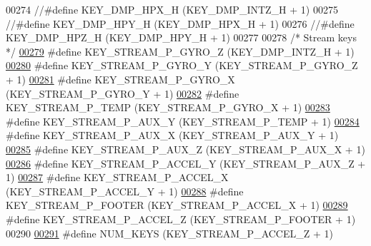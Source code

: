 \begin{DoxyCode}
00274 \textcolor{comment}{//#define KEY\_DMP\_HPX\_H               (KEY\_DMP\_INTZ\_H + 1)}
00275 \textcolor{comment}{//#define KEY\_DMP\_HPY\_H               (KEY\_DMP\_HPX\_H + 1)}
00276 \textcolor{comment}{//#define KEY\_DMP\_HPZ\_H               (KEY\_DMP\_HPY\_H + 1)}
00277 
00278 \textcolor{comment}{/* Stream keys */}
\hypertarget{dmp_key_8h_source.tex_l00279}{}\hyperlink{dmp_key_8h_aa5d4b294e70011d67eb69fac5fd25a2b}{00279} \textcolor{preprocessor}{#define KEY\_STREAM\_P\_GYRO\_Z         (KEY\_DMP\_INTZ\_H + 1)}
\hypertarget{dmp_key_8h_source.tex_l00280}{}\hyperlink{dmp_key_8h_a5fa600da02cc72043e861e7ce367883f}{00280} \textcolor{preprocessor}{#define KEY\_STREAM\_P\_GYRO\_Y         (KEY\_STREAM\_P\_GYRO\_Z + 1)}
\hypertarget{dmp_key_8h_source.tex_l00281}{}\hyperlink{dmp_key_8h_a57050efd179f73b7cbd39acfda55aaa9}{00281} \textcolor{preprocessor}{#define KEY\_STREAM\_P\_GYRO\_X         (KEY\_STREAM\_P\_GYRO\_Y + 1)}
\hypertarget{dmp_key_8h_source.tex_l00282}{}\hyperlink{dmp_key_8h_a8165ecdca80347f0afcc058a0328eb26}{00282} \textcolor{preprocessor}{#define KEY\_STREAM\_P\_TEMP           (KEY\_STREAM\_P\_GYRO\_X + 1)}
\hypertarget{dmp_key_8h_source.tex_l00283}{}\hyperlink{dmp_key_8h_a19282ce8b2d02687eef36c9d9b94fa96}{00283} \textcolor{preprocessor}{#define KEY\_STREAM\_P\_AUX\_Y          (KEY\_STREAM\_P\_TEMP + 1)}
\hypertarget{dmp_key_8h_source.tex_l00284}{}\hyperlink{dmp_key_8h_a905a8b6b6a702a439eec4793921d6338}{00284} \textcolor{preprocessor}{#define KEY\_STREAM\_P\_AUX\_X          (KEY\_STREAM\_P\_AUX\_Y + 1)}
\hypertarget{dmp_key_8h_source.tex_l00285}{}\hyperlink{dmp_key_8h_a49e10328ac2c75c11481933baff54862}{00285} \textcolor{preprocessor}{#define KEY\_STREAM\_P\_AUX\_Z          (KEY\_STREAM\_P\_AUX\_X + 1)}
\hypertarget{dmp_key_8h_source.tex_l00286}{}\hyperlink{dmp_key_8h_ad942f069622a953edc04409b54ace78b}{00286} \textcolor{preprocessor}{#define KEY\_STREAM\_P\_ACCEL\_Y        (KEY\_STREAM\_P\_AUX\_Z + 1)}
\hypertarget{dmp_key_8h_source.tex_l00287}{}\hyperlink{dmp_key_8h_a9f8de22e915f162ee9b32468c6435612}{00287} \textcolor{preprocessor}{#define KEY\_STREAM\_P\_ACCEL\_X        (KEY\_STREAM\_P\_ACCEL\_Y + 1)}
\hypertarget{dmp_key_8h_source.tex_l00288}{}\hyperlink{dmp_key_8h_a28c1f50101e38f495f9faf15412b7535}{00288} \textcolor{preprocessor}{#define KEY\_STREAM\_P\_FOOTER         (KEY\_STREAM\_P\_ACCEL\_X + 1)}
\hypertarget{dmp_key_8h_source.tex_l00289}{}\hyperlink{dmp_key_8h_a56b9da368656d668ea4c453f74d0d92f}{00289} \textcolor{preprocessor}{#define KEY\_STREAM\_P\_ACCEL\_Z        (KEY\_STREAM\_P\_FOOTER + 1)}
00290 
\hypertarget{dmp_key_8h_source.tex_l00291}{}\hyperlink{dmp_key_8h_a9a8c7403a867e0c9543467ee8754050d}{00291} \textcolor{preprocessor}{#define NUM\_KEYS                    (KEY\_STREAM\_P\_ACCEL\_Z + 1)}

\end{DoxyCode}
